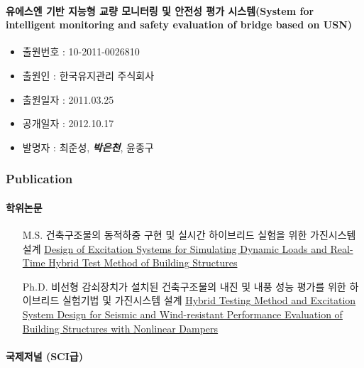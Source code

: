 \documentclass[]{article}
\providecommand{\tightlist}{%
  \setlength{\itemsep}{0pt}\setlength{\parskip}{0pt}}
\let\oldparagraph\paragraph
\renewcommand{\paragraph}[1]{\oldparagraph{#1}\mbox{}}
\begin{document}
\paragraph{유에스엔 기반 지능형 교량 모니터링 및 안전성 평가
시스템(System for intelligent monitoring and safety evaluation of bridge
based on
USN)}

\begin{itemize}
\tightlist
\item
  출원번호 : 10-2011-0026810
\item
  출원인 : 한국유지관리 주식회사
\item
  출원일자 : 2011.03.25
\item
  공개일자 : 2012.10.17
\item
  발명자 : 최준성, \emph{\textbf{박은천}}, 윤종구
\end{itemize}

\subsubsection{Publication}\label{publication}

\paragraph{학위논문}\label{uxd559uxc704uxb17cuxbb38}

\begin{itemize}
\tightlist
\item[M.S.]
  건축구조물의 동적하중 구현 및 실시간 하이브리드 실험을 위한 가진시스템
  설계
  \href{http://m.riss.kr/search/detail/DetailView.do?p_mat_type=be54d9b8bc7cdb09\&control_no=6edb0a539213abf9ffe0bdc3ef48d419}{Design
  of Excitation Systems for Simulating Dynamic Loads and Real-Time
  Hybrid Test Method of Building Structures}
\item[Ph.D.]
  비선형 감쇠장치가 설치된 건축구조물의 내진 및 내풍 성능 평가를 위한 하이브리드 실험기법 및 가진시스템 설계
  \href{http://m.riss.kr/search/detail/DetailView.do?p_mat_type=be54d9b8bc7cdb09\&control_no=6edb0a539213abf9ffe0bdc3ef48d419}{Hybrid Testing Method and Excitation System Design for Seismic and Wind-resistant Performance Evaluation of Building Structures with Nonlinear Dampers}
\end{itemize}

\paragraph{국제저널 (SCI급)}
\end{document}
